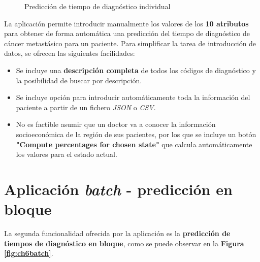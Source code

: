 \begin{figure}[h]
	\vspace{-3mm}
	\centering
	\captionsetup{belowskip=-25pt, justification=centering}
	\caption{Predicción de tiempo de diagnóstico individual}
	\label{fig:ch6single}
\end{figure}

La aplicación permite introducir manualmente los valores de los \textbf{10 atributos} para obtener de forma automática una predicción del tiempo de diagnóstico de cáncer metastásico para un paciente. Para simplificar la tarea de introducción de datos, se ofrecen las siguientes facilidades:

\begin{itemize}[parsep=1pt, itemsep=1pt, topsep=2pt]
	\item Se incluye una \textbf{descripción completa} de todos los códigos de diagnóstico y la posibilidad de buscar por descripción.
	\item Se incluye opción para introducir automáticamente toda la información del paciente a partir de un fichero \textit{JSON} o \textit{CSV}.
	\item No es factible asumir que un doctor va a conocer la información socioeconómica de la región de sus pacientes, por los que se incluye un botón \textbf{"Compute percentages for chosen state"} que calcula automáticamente los valores para el estado actual.
\end{itemize}

\vspace*{-8mm}
\section{Aplicación \textit{batch} - predicción en bloque}

La segunda funcionalidad ofrecida por la aplicación es la \textbf{predicción de tiempos de diagnóstico en bloque}, como se puede observar en la \textbf{Figura \ref{fig:ch6batch}}.

